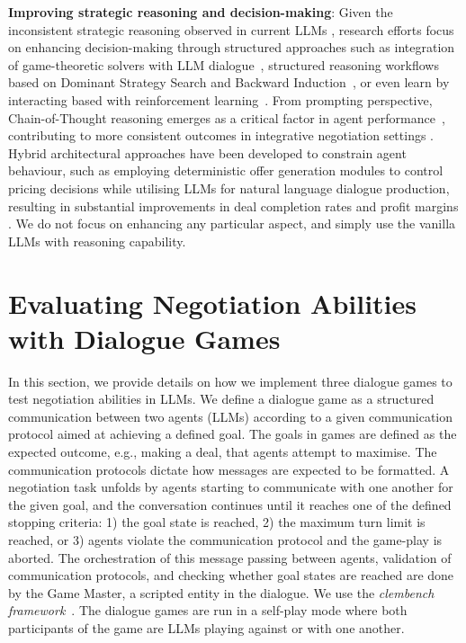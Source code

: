 \documentclass[11pt]{article}
\begin{document}
\textbf{Improving strategic reasoning and decision-making}: Given the inconsistent strategic reasoning observed in current LLMs \cite{wong2025reasoningcapabilitieslargelanguage}, research efforts focus on enhancing decision-making through structured approaches such as integration of game-theoretic solvers with LLM dialogue~\cite{DBLP:journals/corr/abs-2402-01704}, structured reasoning workflows based on Dominant Strategy Search and Backward Induction~\cite{DBLP:journals/corr/abs-2411-05990}, or even learn by interacting based with reinforcement learning~\cite{DBLP:conf/iclr/CaoLLLTC18}. From prompting perspective, Chain-of-Thought reasoning emerges as a critical factor in agent performance~\cite{DBLP:journals/corr/abs-2305-19165}, contributing to more consistent outcomes in integrative negotiation settings \cite{DBLP:journals/corr/abs-2503-06416}. Hybrid architectural approaches have been developed to constrain agent behaviour, such as employing deterministic offer generation modules to control pricing decisions while utilising LLMs for natural language dialogue production, resulting in substantial improvements in deal completion rates and profit margins \cite{DBLP:conf/acl/Xia0RMZ0024}. We do not focus on enhancing any particular aspect, and simply use the vanilla LLMs with reasoning capability.

\section{Evaluating Negotiation Abilities with Dialogue Games}

In this section, we provide details on how we implement three dialogue games to test negotiation abilities in LLMs. We define a dialogue game as a structured communication between two agents (LLMs) according to a given communication protocol aimed at achieving a defined goal. The goals in games are defined as the expected outcome, e.g., making a deal, that agents attempt to maximise. The communication protocols dictate how messages are expected to be formatted. A negotiation task unfolds by agents starting to communicate with one another for the given goal, and the conversation continues until it reaches one of the defined stopping criteria: 1) the goal state is reached, 2) the maximum turn limit is reached, or 3) agents violate the communication protocol and the game-play is aborted. The orchestration of this message passing between agents, validation of communication protocols, and checking whether goal states are reached are done by the Game Master, a scripted entity in the dialogue. We use the \textit{clembench framework}~\cite{chalamalasetti-etal-2023-clembench}. The dialogue games are run in a self-play mode where both participants of the game are LLMs playing against or with one another.
\end{document}
